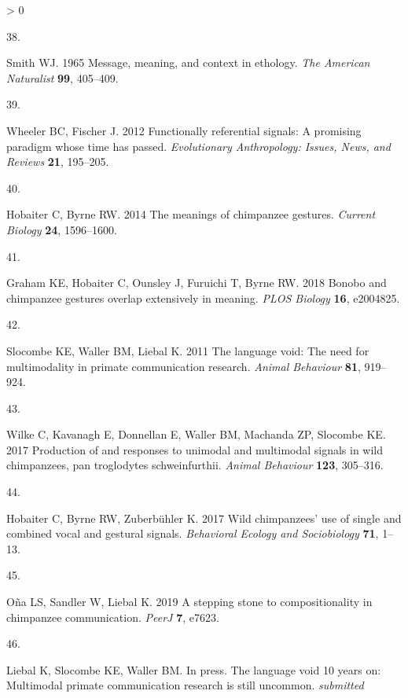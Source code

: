 \documentclass[
  english,
  man,floatsintext]{apa6}
\newlength{\cslhangindent}
\newlength{\csllabelwidth}
\newenvironment{CSLReferences}[2] %
 {%
  \setlength{\parindent}{0pt}
  \ifodd #1 \everypar{\setlength{\hangindent}{\cslhangindent}}\ignorespaces\fi
  \ifnum #2 > 0
  \setlength{\parskip}{#2\baselineskip}
  \fi
 }%
 {}
\newcommand{\CSLLeftMargin}[1]{\parbox[t]{\csllabelwidth}{#1}}
\newcommand{\CSLRightInline}[1]{\parbox[t]{\linewidth - \csllabelwidth}{#1}\break}
\begin{document}
\begin{CSLReferences}{0}{0}
\leavevmode\hypertarget{ref-smith1965message}{}%
\CSLLeftMargin{38. }
\CSLRightInline{Smith WJ. 1965 Message, meaning, and context in ethology. \emph{The American Naturalist} \textbf{99}, 405--409.}

\leavevmode\hypertarget{ref-wheeler2012functionally}{}%
\CSLLeftMargin{39. }
\CSLRightInline{Wheeler BC, Fischer J. 2012 Functionally referential signals: A promising paradigm whose time has passed. \emph{Evolutionary Anthropology: Issues, News, and Reviews} \textbf{21}, 195--205.}

\leavevmode\hypertarget{ref-hobaiter2014meanings}{}%
\CSLLeftMargin{40. }
\CSLRightInline{Hobaiter C, Byrne RW. 2014 The meanings of chimpanzee gestures. \emph{Current Biology} \textbf{24}, 1596--1600.}

\leavevmode\hypertarget{ref-graham2018bonobo}{}%
\CSLLeftMargin{41. }
\CSLRightInline{Graham KE, Hobaiter C, Ounsley J, Furuichi T, Byrne RW. 2018 Bonobo and chimpanzee gestures overlap extensively in meaning. \emph{PLOS Biology} \textbf{16}, e2004825.}

\leavevmode\hypertarget{ref-slocombe2011language}{}%
\CSLLeftMargin{42. }
\CSLRightInline{Slocombe KE, Waller BM, Liebal K. 2011 The language void: The need for multimodality in primate communication research. \emph{Animal Behaviour} \textbf{81}, 919--924.}

\leavevmode\hypertarget{ref-wilke2017production}{}%
\CSLLeftMargin{43. }
\CSLRightInline{Wilke C, Kavanagh E, Donnellan E, Waller BM, Machanda ZP, Slocombe KE. 2017 Production of and responses to unimodal and multimodal signals in wild chimpanzees, pan troglodytes schweinfurthii. \emph{Animal Behaviour} \textbf{123}, 305--316.}

\leavevmode\hypertarget{ref-hobaiter2017wild}{}%
\CSLLeftMargin{44. }
\CSLRightInline{Hobaiter C, Byrne RW, Zuberbühler K. 2017 Wild chimpanzees' use of single and combined vocal and gestural signals. \emph{Behavioral Ecology and Sociobiology} \textbf{71}, 1--13.}

\leavevmode\hypertarget{ref-ona2019stepping}{}%
\CSLLeftMargin{45. }
\CSLRightInline{Oña LS, Sandler W, Liebal K. 2019 A stepping stone to compositionality in chimpanzee communication. \emph{PeerJ} \textbf{7}, e7623.}

\leavevmode\hypertarget{ref-liebalsublanguage}{}%
\CSLLeftMargin{46. }
\CSLRightInline{Liebal K, Slocombe KE, Waller BM. In press. The language void 10 years on: Multimodal primate communication research is still uncommon. \emph{submitted} }


\end{CSLReferences}
\end{document}
